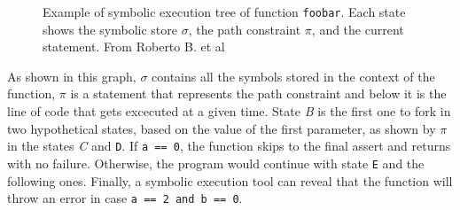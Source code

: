 \begin{figure}[H]
{%
}
\caption{Example of symbolic execution tree of function \texttt{foobar}. Each state shows the symbolic store $\sigma$, the path constraint $\pi$, and the current statement. From Roberto B. et al \cite{symbolicExecutionDef}}
\end{figure}

As shown in this graph, $\sigma$ contains all the symbols stored in the context of the function, $\pi$ is a statement that represents the path constraint and below it is the line of code that gets excecuted at a given time. State \textit{B} is the first one to fork in two hypothetical states, based on the value of the first parameter, as shown by $\pi$ in the states \textit{C} and \texttt{D}. If \texttt{a == 0}, the function skips to the final assert and returns with no failure. Otherwise, the program would continue with state \texttt{E} and the following ones. Finally, a symbolic execution tool can reveal that the function will throw an error in case \texttt{a == 2 and b == 0}.

